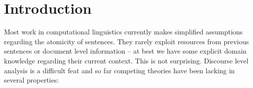 \chapter{Introduction}

Most work in computational linguistics currently makes simplified assumptions regarding the atomicity of sentences. They rarely exploit resources from previous sentences or document level information -- at best we have some explicit domain knowledge regarding their current context. This is not surprising. Discourse level analysis is a difficult feat and so far competing theories have been lacking in several properties:
